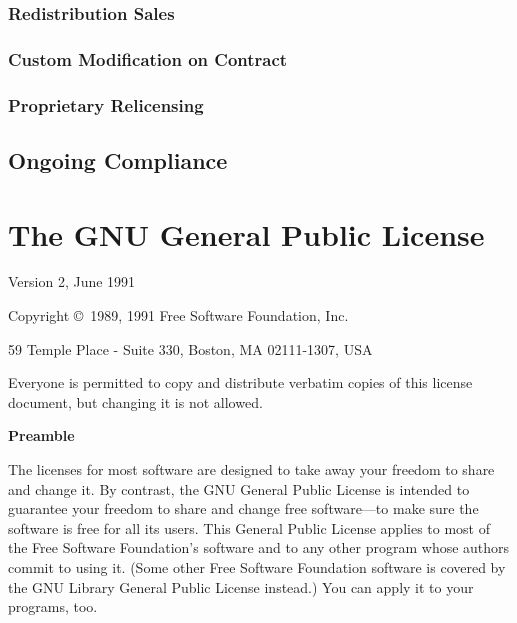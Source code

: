 \documentclass[12pt]{report}
\begin{document}
\subsection{Redistribution Sales}

\subsection{Custom Modification on Contract}
 

\subsection{Proprietary Relicensing}
\label{Proprietary Relicensing}


\section{Ongoing Compliance}

\appendix

\chapter{The GNU General Public License}

\begin{center}
{\parindent 0in

Version 2, June 1991

Copyright \copyright\ 1989, 1991 Free Software Foundation, Inc.

\bigskip

59 Temple Place - Suite 330, Boston, MA  02111-1307, USA

\bigskip

Everyone is permitted to copy and distribute verbatim copies
of this license document, but changing it is not allowed.
}
\end{center}

\begin{center}
{\bf\large Preamble}
\end{center}


The licenses for most software are designed to take away your freedom to
share and change it.  By contrast, the GNU General Public License is
intended to guarantee your freedom to share and change free software---to
make sure the software is free for all its users.  This General Public
License applies to most of the Free Software Foundation's software and to
any other program whose authors commit to using it.  (Some other Free
Software Foundation software is covered by the GNU Library General Public
License instead.)  You can apply it to your programs, too.
\end{document}
